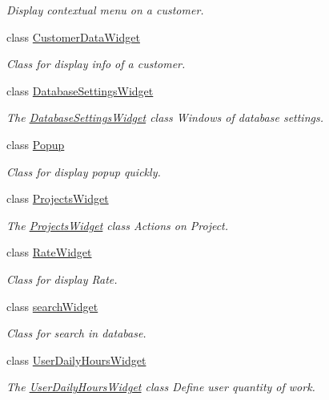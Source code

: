 \begin{DoxyCompactItemize}
\begin{DoxyCompactList}\small\item\em Display contextual menu on a customer. \end{DoxyCompactList}\item 
class \hyperlink{classGui_1_1Widgets_1_1CustomerDataWidget}{Customer\-Data\-Widget}
\begin{DoxyCompactList}\small\item\em Class for display info of a customer. \end{DoxyCompactList}\item 
class \hyperlink{classGui_1_1Widgets_1_1DatabaseSettingsWidget}{Database\-Settings\-Widget}
\begin{DoxyCompactList}\small\item\em The \hyperlink{classGui_1_1Widgets_1_1DatabaseSettingsWidget}{Database\-Settings\-Widget} class Windows of database settings. \end{DoxyCompactList}\item 
class \hyperlink{classGui_1_1Widgets_1_1Popup}{Popup}
\begin{DoxyCompactList}\small\item\em Class for display popup quickly. \end{DoxyCompactList}\item 
class \hyperlink{classGui_1_1Widgets_1_1ProjectsWidget}{Projects\-Widget}
\begin{DoxyCompactList}\small\item\em The \hyperlink{classGui_1_1Widgets_1_1ProjectsWidget}{Projects\-Widget} class Actions on Project. \end{DoxyCompactList}\item 
class \hyperlink{classGui_1_1Widgets_1_1RateWidget}{Rate\-Widget}
\begin{DoxyCompactList}\small\item\em Class for display Rate. \end{DoxyCompactList}\item 
class \hyperlink{classGui_1_1Widgets_1_1searchWidget}{search\-Widget}
\begin{DoxyCompactList}\small\item\em Class for search in database. \end{DoxyCompactList}\item 
class \hyperlink{classGui_1_1Widgets_1_1UserDailyHoursWidget}{User\-Daily\-Hours\-Widget}
\begin{DoxyCompactList}\small\item\em The \hyperlink{classGui_1_1Widgets_1_1UserDailyHoursWidget}{User\-Daily\-Hours\-Widget} class Define user quantity of work. \end{DoxyCompactList}\end{DoxyCompactItemize}

